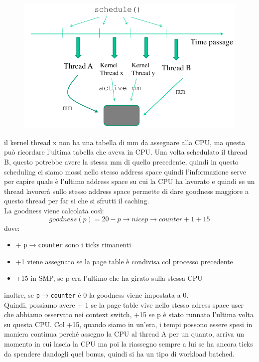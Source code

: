 \documentclass[12pt, oneside]{extbook}
\begin{document}
\begin{figure}
	\includegraphics[scale=0.5]{immagini/schedule_assignement.png}
\end{figure}
il kernel thread x non ha una tabella di mm da assegnare alla CPU, ma questa può ricordare l'ultima tabella che aveva in CPU. Una volta schedulato il thread B, questo potrebbe avere la stessa mm di quello precedente, quindi in questo scheduling ci siamo mossi nello stesso address space quindi l'informazione serve per capire quale è l'ultimo address space su cui la CPU ha lavorato e quindi se un thread lavorerà sullo stesso address space permette di dare goodness maggiore a questo thread per far si che si sfrutti il caching.\\La goodness viene calcolata così:
\begin{equation}
goodness(p) = 20 - p \rightarrow nice
p \rightarrow counter +1 +15
\end{equation}
dove:
\begin{itemize}
	\item + \texttt{p$\rightarrow$counter} sono i ticks rimanenti
	\item +1 viene assegnato se la page table è condivisa col processo precedente
	\item +15 in SMP, se p era l'ultimo che ha girato sulla stessa CPU
\end{itemize}
inoltre, se \texttt{p$\rightarrow$counter} è 0 la goodness viene impostata a 0.\\Quindi, possiamo avere + 1 se la page table vive nello stesso adress space user che abbiamo osservato nei context switch, +15 se p è stato runnato l'ultima volta su questa CPU. Col +15, quando siamo in un'era, i tempi possono essere spesi in maniera continua perché assegno la CPU al thread A per un quanto, arriva un momento in cui lascia la CPU ma poi la riassegno sempre a lui se ha ancora ticks da spendere dandogli quel bonus, quindi si ha un tipo di workload batched.
\end{document}
